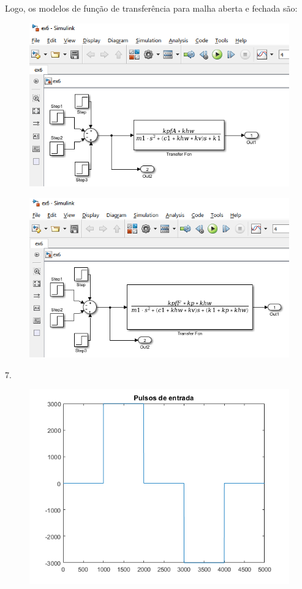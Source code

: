 \documentclass[a4paper,11pt]{article}
\begin{document}
Logo, os modelos de função de transferência para malha aberta e fechada são:

\begin{figure}[H]
\includegraphics[scale=0.9]{exp01e06-aberta}
\centering
\end{figure}

\begin{figure}[H]
\includegraphics[scale=0.9]{exp01e06-fechada}
\centering
\end{figure}

7.
\begin{figure}[H]
\includegraphics[scale=0.8]{exp01e07}
\centering
\end{figure}
\end{document}
